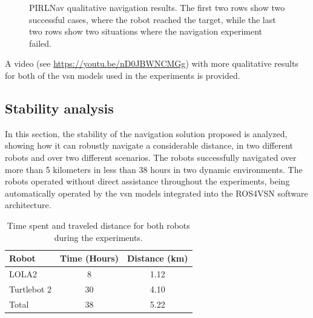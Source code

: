 \begin{figure}
    \centering
    \caption[PIRLNav qualitative navigation results]{PIRLNav qualitative navigation results. The first two rows show two successful cases, where the robot reached the target, while the last two rows show two situations where the navigation experiment failed.}
    \label{fig:pirlnav_qualitative}
\end{figure}

A video (see \url{https://youtu.be/nD0JBWNCMGg}) with more qualitative results for both of the \acrshort{vsn} models used in the experiments is provided.

\subsection{Stability analysis}
\label{subsec:marathon}

In this section, the stability of the navigation solution proposed is analyzed, showing how it can robustly navigate a considerable distance, in two different robots and over two different scenarios.
The robots successfully navigated over more than 5 kilometers in less than 38 hours in two dynamic environments.
The robots operated without direct assistance throughout the experiments, being automatically operated by the \acrshort{vsn} models integrated into the ROS4VSN software architecture.

\begin{table}
    \centering
    \begin{tabular}{l|cc}
        \toprule
        \textbf{Robot} & Time (Hours) & Distance (km) \\
        \midrule
        LOLA2          & 8            & 1.12          \\
        Turtlebot 2    & 30           & 4.10          \\\midrule
        Total          & 38           & 5.22          \\
        \bottomrule
    \end{tabular}
    \caption{Time spent and traveled distance for both robots during the experiments.}
    \label{tab:stability}
\end{table}

